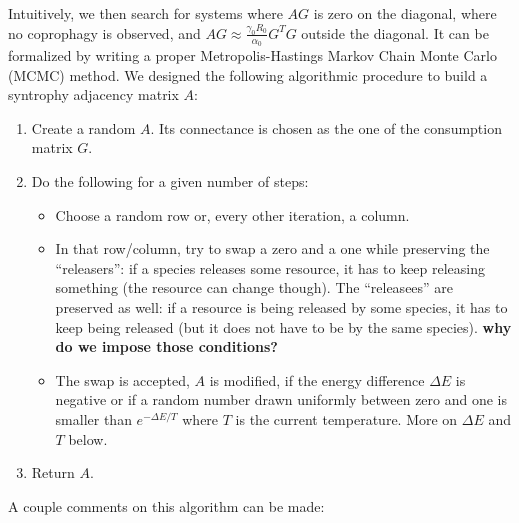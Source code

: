 \documentclass[12pt, titlepage]{report}
\begin{document}
Intuitively, we then search for systems where $AG$ is zero on the diagonal, \ie where no coprophagy is observed, and $AG \approx \frac{\gamma_0R_0}{\alpha_0}G^TG$ outside the diagonal. It can be formalized by writing a proper Metropolis-Hastings Markov Chain Monte Carlo (MCMC) method. We designed the following algorithmic procedure to build a syntrophy adjacency matrix $A$:
\begin{enumerate}
\item Create a random $A$. Its connectance is chosen as the one of the consumption matrix $G$.
\item Do the following for a given number of steps:
\begin{itemize}
\item Choose a random row or, every other iteration, a column.
\item In that row/column, try to swap a zero and a one while preserving the ``releasers'': if a species releases some resource, it has to keep releasing something (the resource can change though). The ``releasees'' are preserved as well: if a resource is being released by some species, it has to keep being released (but it does not have to be by the same species). \textbf{why do we impose those conditions?}
\item The swap is accepted, \ie $A$ is modified, if the energy difference $\Delta E$ is negative or if a random number drawn uniformly between zero and one is smaller than $e^{-\Delta E/T}$ where $T$ is the current temperature. More on $\Delta E$ and $T$ below.
\end{itemize}
\item Return $A$.
\end{enumerate}
A couple comments on this algorithm can be made:
\end{document}
